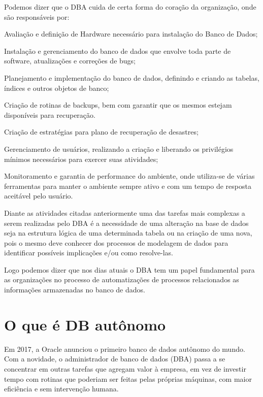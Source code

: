Podemos dizer que o DBA cuida de certa forma do coração da organização, onde são responsáveis por:
\begin{alineas}
\item Avaliação e definição de Hardware necessário para instalação do Banco de Dados;
\item Instalação e gerenciamento do banco de dados que envolve toda parte de software, atualizações e correções de bugs;
\item Planejamento e implementação do banco de dados, definindo e criando as tabelas, índices e outros objetos de banco;
\item Criação de rotinas de backups, bem com garantir que os mesmos estejam disponíveis para recuperação.
\item Criação de estratégias para plano de recuperação de desastres;
\item Gerenciamento de usuários, realizando a criação e liberando os privilégios mínimos necessários para exercer suas atividades;
\item Monitoramento e garantia de performance do ambiente, onde utiliza-se de várias ferramentas para manter o ambiente sempre ativo e com um tempo de resposta aceitável pelo usuário.
\end{alineas} 


Diante as atividades citadas anteriormente uma das tarefas mais complexas a serem realizadas pelo DBA é a necessidade de uma alteração na base de dados seja na estrutura lógica de uma determinada tabela ou na criação de uma nova, pois o mesmo deve conhecer dos processos de modelagem de dados para identificar possíveis implicações e/ou como resolve-las.


Logo podemos dizer que nos dias atuais o DBA tem um papel fundamental para as organizações no processo de automatizações de processos relacionados as informações armazenadas no banco de dados.


\section{O que é DB autônomo}

\begin{citacao}
Em 2017, a Oracle anunciou o primeiro banco de dados autônomo do mundo. Com a novidade, o administrador de banco de dados (DBA) passa a se concentrar em outras tarefas que agregam valor à empresa, em vez de investir tempo com rotinas que poderiam ser feitas pelas próprias máquinas, com maior eficiência e sem intervenção humana.\cite[p. ~34]{TecnoBlog}
\end{citacao}

